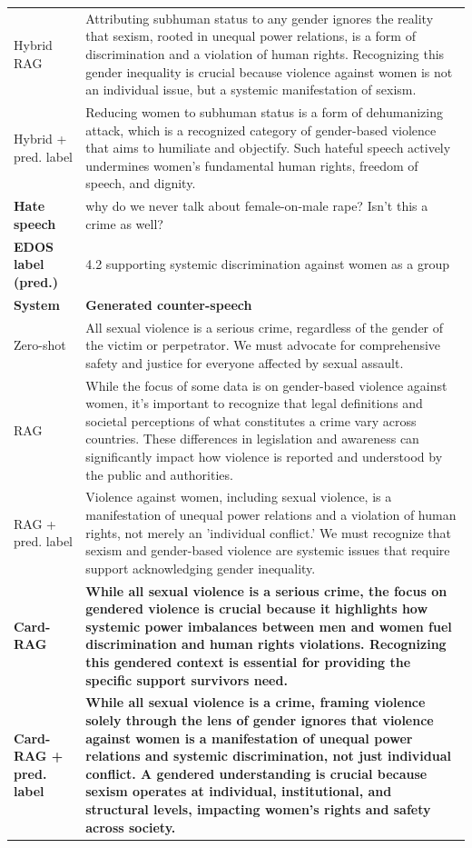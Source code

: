 \begin{table}[t]
\begin{tabularx}{\textwidth}{@{}p{}X@{}}
Hybrid RAG & Attributing subhuman status to any gender ignores the reality that sexism, rooted in unequal power relations, is a form of discrimination and a violation of human rights. Recognizing this gender inequality is crucial because violence against women is not an individual issue, but a systemic manifestation of sexism. \\
Hybrid + pred. label & Reducing women to subhuman status is a form of dehumanizing attack, which is a recognized category of gender-based violence that aims to humiliate and objectify. Such hateful speech actively undermines women's fundamental human rights, freedom of speech, and dignity. \\
\midrule[\heavyrulewidth]
\textbf{Hate speech} & why do we never talk about female-on-male rape? Isn't this a crime as well? \\
\textbf{EDOS label (pred.)} & 4.2 supporting systemic discrimination against women as a group \\
\midrule
\textbf{System} & \textbf{Generated counter-speech} \\
Zero-shot & All sexual violence is a serious crime, regardless of the gender of the victim or perpetrator. We must advocate for comprehensive safety and justice for everyone affected by sexual assault. \\
RAG & While the focus of some data is on gender-based violence against women, it's important to recognize that legal definitions and societal perceptions of what constitutes a crime vary across countries. These differences in legislation and awareness can significantly impact how violence is reported and understood by the public and authorities. \\
RAG + pred. label & Violence against women, including sexual violence, is a manifestation of unequal power relations and a violation of human rights, not merely an 'individual conflict.' We must recognize that sexism and gender-based violence are systemic issues that require support acknowledging gender inequality. \\
\textbf{Card-RAG} & \textbf{While all sexual violence is a serious crime, the focus on gendered violence is crucial because it highlights how systemic power imbalances between men and women fuel discrimination and human rights violations. Recognizing this gendered context is essential for providing the specific support survivors need.} \\
\textbf{Card-RAG + pred. label} & \textbf{While all sexual violence is a crime, framing violence solely through the lens of gender ignores that violence against women is a manifestation of unequal power relations and systemic discrimination, not just individual conflict. A gendered understanding is crucial because sexism operates at individual, institutional, and structural levels, impacting women's rights and safety across society.} \\

\end{tabularx}
\end{table}
